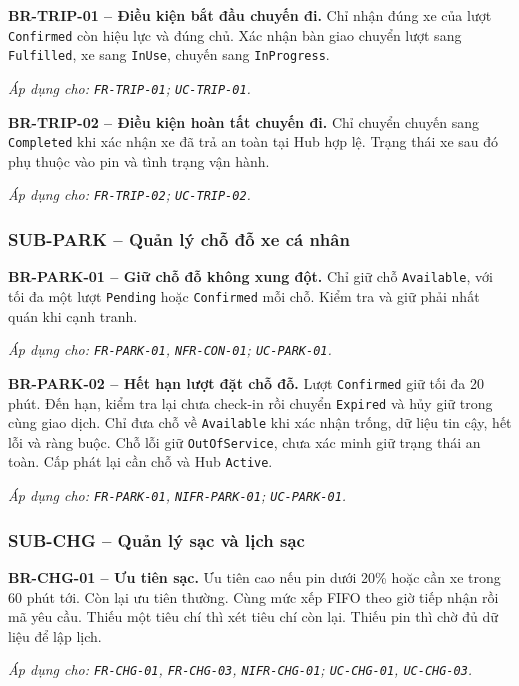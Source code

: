 \noindent\textbf{BR-TRIP-01 -- Điều kiện bắt đầu chuyến đi.} Chỉ nhận đúng xe của lượt \texttt{Confirmed} còn hiệu lực và đúng chủ. Xác nhận bàn giao chuyển lượt sang \texttt{Fulfilled}, xe sang \texttt{InUse}, chuyến sang \texttt{InProgress}.

\textit{Áp dụng cho: \texttt{FR-TRIP-01}; \texttt{UC-TRIP-01}.}

\medskip
\noindent\textbf{BR-TRIP-02 -- Điều kiện hoàn tất chuyến đi.} Chỉ chuyển chuyến sang \texttt{Completed} khi xác nhận xe đã trả an toàn tại Hub hợp lệ. Trạng thái xe sau đó phụ thuộc vào pin và tình trạng vận hành.

\textit{Áp dụng cho: \texttt{FR-TRIP-02}; \texttt{UC-TRIP-02}.}

\subsubsection{SUB-PARK -- Quản lý chỗ đỗ xe cá nhân}

\noindent\textbf{BR-PARK-01 -- Giữ chỗ đỗ không xung đột.} Chỉ giữ chỗ \texttt{Available}, với tối đa một lượt \texttt{Pending} hoặc \texttt{Confirmed} mỗi chỗ. Kiểm tra và giữ phải nhất quán khi cạnh tranh.

\textit{Áp dụng cho: \texttt{FR-PARK-01}, \texttt{NFR-CON-01}; \texttt{UC-PARK-01}.}

\medskip
\noindent\textbf{BR-PARK-02 -- Hết hạn lượt đặt chỗ đỗ.} Lượt \texttt{Confirmed} giữ tối đa 20 phút. Đến hạn, kiểm tra lại chưa check-in rồi chuyển \texttt{Expired} và hủy giữ trong cùng giao dịch. Chỉ đưa chỗ về \texttt{Available} khi xác nhận trống, dữ liệu tin cậy, hết lỗi và ràng buộc. Chỗ lỗi giữ \texttt{OutOfService}, chưa xác minh giữ trạng thái an toàn. Cấp phát lại cần chỗ và Hub \texttt{Active}.

\textit{Áp dụng cho: \texttt{FR-PARK-01}, \texttt{NIFR-PARK-01}; \texttt{UC-PARK-01}.}

\subsubsection{SUB-CHG -- Quản lý sạc và lịch sạc}

\noindent\textbf{BR-CHG-01 -- Ưu tiên sạc.} Ưu tiên cao nếu pin dưới 20\% hoặc cần xe trong 60 phút tới. Còn lại ưu tiên thường. Cùng mức xếp FIFO theo giờ tiếp nhận rồi mã yêu cầu. Thiếu một tiêu chí thì xét tiêu chí còn lại. Thiếu pin thì chờ đủ dữ liệu để lập lịch.

\textit{Áp dụng cho: \texttt{FR-CHG-01}, \texttt{FR-CHG-03}, \texttt{NIFR-CHG-01}; \texttt{UC-CHG-01}, \texttt{UC-CHG-03}.}

